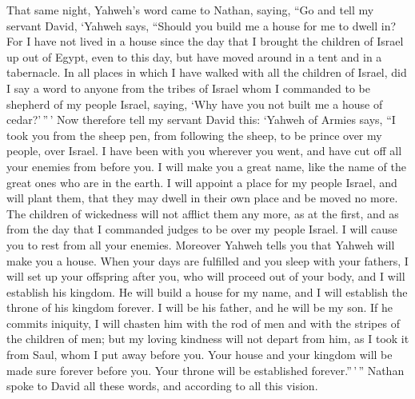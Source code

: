  That same night, Yahweh's word came to Nathan, saying,
 ``Go and tell my servant David, `Yahweh says, ``Should
you build me a house for me to dwell in?  For I have not
lived in a house since the day that I brought the children of Israel up
out of Egypt, even to this day, but have moved around in a tent and in a
tabernacle.  In all places in which I have walked with all
the children of Israel, did I say a word to anyone from the tribes of
Israel whom I commanded to be shepherd of my people Israel, saying, `Why
have you not built me a house of cedar?'\,''\,'  Now
therefore tell my servant David this: `Yahweh of Armies says, ``I took
you from the sheep pen, from following the sheep, to be prince over my
people, over Israel.  I have been with you wherever you
went, and have cut off all your enemies from before you. I will make you
a great name, like the name of the great ones who are in the earth.
 I will appoint a place for my people Israel, and will
plant them, that they may dwell in their own place and be moved no more.
The children of wickedness will not afflict them any more, as at the
first,  and as from the day that I commanded judges to be
over my people Israel. I will cause you to rest from all your enemies.
Moreover Yahweh tells you that Yahweh will make you a house.
 When your days are fulfilled and you sleep with your
fathers, I will set up your offspring after you, who will proceed out of
your body, and I will establish his kingdom.  He will
build a house for my name, and I will establish the throne of his
kingdom forever.  I will be his father, and he will be my
son. If he commits iniquity, I will chasten him with the rod of men and
with the stripes of the children of men;  but my loving
kindness will not depart from him, as I took it from Saul, whom I put
away before you.  Your house and your kingdom will be
made sure forever before you. Your throne will be established
forever.''\,'\,''  Nathan spoke to David all these words,
and according to all this vision.

